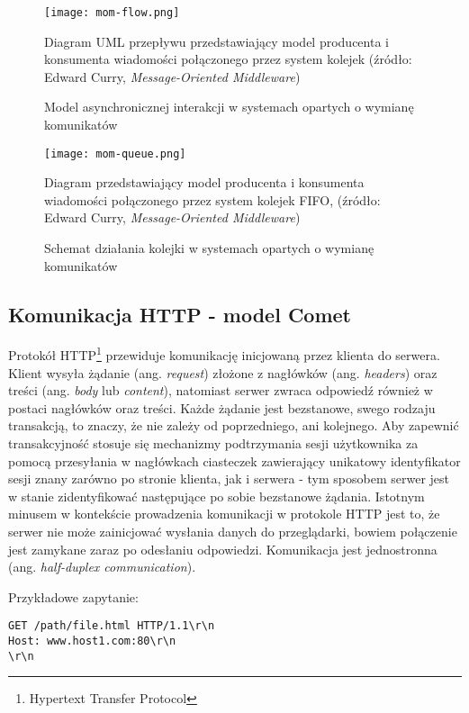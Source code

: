 \begin{figure}[H]
  \centering
    \texttt{[image: mom-flow.png]}
  \caption[Model asynchronicznej interakcji w systemach opartych o wymianę komunikatów]{Model asynchronicznej interakcji w systemach opartych o wymianę komunikatów}
    Diagram UML przepływu przedstawiający model producenta i konsumenta wiadomości połączonego przez system kolejek (źródło: Edward Curry, \emph{Message-Oriented Middleware}\cite{message-oriented-middleware})
\end{figure}

\begin{figure}[H]
  \centering
    \texttt{[image: mom-queue.png]}
  \caption[Schemat działania kolejki w systemach opartych o wymianę komunikatów]{Schemat działania kolejki w systemach opartych o wymianę komunikatów}
    Diagram przedstawiający model producenta i konsumenta wiadomości połączonego przez system kolejek FIFO, (źródło: Edward Curry, \emph{Message-Oriented Middleware}\cite{message-oriented-middleware})
\end{figure}

\subsection{Komunikacja HTTP - model Comet}
\label{sub:communication-methods}

Protokół HTTP\footnote{Hypertext Transfer Protocol} przewiduje komunikację inicjowaną przez klienta do serwera\cite{http-rfc}. Klient wysyła żądanie (ang. \emph{request}) złożone z nagłówków (ang. \emph{headers}) oraz treści (ang. \emph{body} lub \emph{content}), natomiast serwer zwraca odpowiedź również w postaci nagłówków oraz treści. Każde żądanie jest bezstanowe, swego rodzaju transakcją, to znaczy, że nie zależy od poprzedniego, ani kolejnego. Aby zapewnić transakcyjność stosuje się mechanizmy podtrzymania sesji użytkownika za pomocą przesyłania w nagłówkach ciasteczek zawierający unikatowy identyfikator sesji znany zarówno po stronie klienta, jak i serwera - tym sposobem serwer jest w stanie zidentyfikować następujące po sobie bezstanowe żądania. Istotnym minusem w kontekście prowadzenia komunikacji w protokole HTTP jest to, że serwer nie może zainicjować wysłania danych do przeglądarki, bowiem połączenie jest zamykane zaraz po odesłaniu odpowiedzi. Komunikacja jest jednostronna (ang. \emph{half-duplex communication}).

Przykładowe zapytanie:
\lstset{language=Octave}
\begin{lstlisting}
GET /path/file.html HTTP/1.1\r\n
Host: www.host1.com:80\r\n
\r\n
\end{lstlisting}

